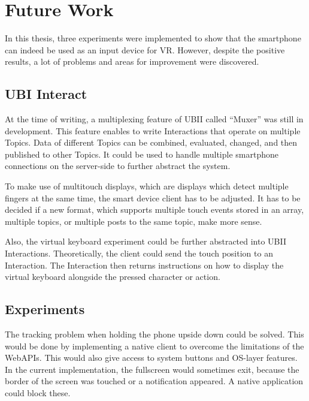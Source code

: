 \chapter{Future Work}\label{chapter:future-work}

In this thesis, three experiments were implemented to show that the smartphone can indeed be used as an input device for \gls{VR}. However, despite the positive results, a lot of problems and areas for improvement were discovered. %


\section{UBI Interact}\label{section:fw-ubii}

At the time of writing, a multiplexing feature of \gls{UBII} called \enquote{Muxer} was still in development. This feature enables to write Interactions that operate on multiple Topics. Data of different Topics can be combined, evaluated, changed, and then published to other Topics. It could be used to handle multiple smartphone connections on the server-side to further abstract the system.

To make use of multitouch displays, which are displays which detect multiple fingers at the same time, the smart device client has to be adjusted. It has to be decided if a new format, which supports multiple touch events stored in an array, multiple topics, or multiple posts to the same topic, make more sense.

Also, the virtual keyboard experiment could be further abstracted into \gls{UBII} Interactions. Theoretically, the client could send the touch position to an Interaction. The Interaction then returns instructions on how to display the virtual keyboard alongside the pressed character or action.


\section{Experiments}\label{section:fw-experiments}

The tracking problem when holding the phone upside down could be solved. This would be done by implementing a native client to overcome the limitations of the Web\glspl{API}. This would also give access to system buttons and \gls{OS}-layer features. In the current implementation, the fullscreen would sometimes exit, because the border of the screen was touched or a notification appeared. A native application could block these.

